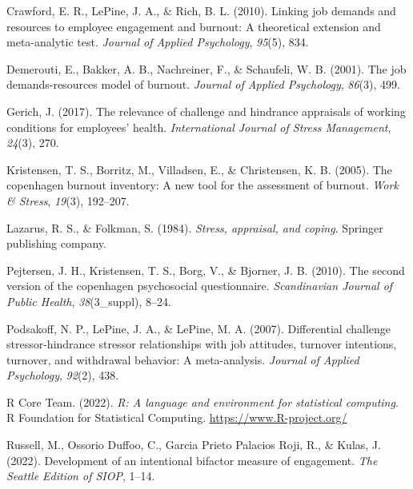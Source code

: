 \documentclass[
  man]{apa6}
\newlength{\cslhangindent}
\newlength{\cslentryspacingunit} %
\newenvironment{CSLReferences}[2] %
 {%
  \setlength{\parindent}{0pt}
  \ifodd #1
  \let\oldpar\par
  \def\par{\hangindent=\cslhangindent\oldpar}
  \fi
  \setlength{\parskip}{#2\cslentryspacingunit}
 }%
 {}
\begin{document}
\begin{CSLReferences}{1}{0}
\leavevmode{}%
Crawford, E. R., LePine, J. A., \& Rich, B. L. (2010). Linking job demands and resources to employee engagement and burnout: A theoretical extension and meta-analytic test. \emph{Journal of Applied Psychology}, \emph{95}(5), 834.

\leavevmode{}%
Demerouti, E., Bakker, A. B., Nachreiner, F., \& Schaufeli, W. B. (2001). The job demands-resources model of burnout. \emph{Journal of Applied Psychology}, \emph{86}(3), 499.

\leavevmode{}%
Gerich, J. (2017). The relevance of challenge and hindrance appraisals of working conditions for employees' health. \emph{International Journal of Stress Management}, \emph{24}(3), 270.

\leavevmode{}%
Kristensen, T. S., Borritz, M., Villadsen, E., \& Christensen, K. B. (2005). The copenhagen burnout inventory: A new tool for the assessment of burnout. \emph{Work \& Stress}, \emph{19}(3), 192--207.

\leavevmode{}%
Lazarus, R. S., \& Folkman, S. (1984). \emph{Stress, appraisal, and coping}. Springer publishing company.

\leavevmode{}%
Pejtersen, J. H., Kristensen, T. S., Borg, V., \& Bjorner, J. B. (2010). The second version of the copenhagen psychosocial questionnaire. \emph{Scandinavian Journal of Public Health}, \emph{38}(3\_suppl), 8--24.

\leavevmode{}%
Podsakoff, N. P., LePine, J. A., \& LePine, M. A. (2007). Differential challenge stressor-hindrance stressor relationships with job attitudes, turnover intentions, turnover, and withdrawal behavior: A meta-analysis. \emph{Journal of Applied Psychology}, \emph{92}(2), 438.

\leavevmode{}%
R Core Team. (2022). \emph{R: A language and environment for statistical computing}. R Foundation for Statistical Computing. \url{https://www.R-project.org/}

\leavevmode{}%
Russell, M., Ossorio Duffoo, C., Garcia Prieto Palacios Roji, R., \& Kulas, J. (2022). Development of an intentional bifactor measure of engagement. \emph{The Seattle Edition of SIOP}, 1--14.


\end{CSLReferences}
\end{document}
